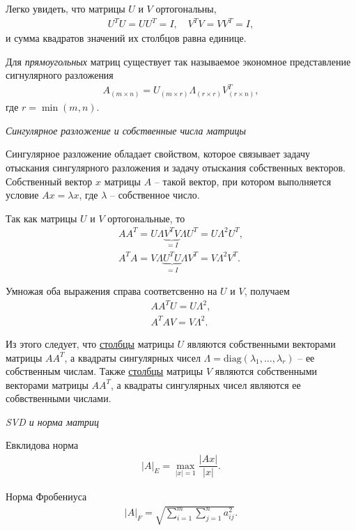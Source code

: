 \documentclass[%
	11pt,
	a4paper,
	utf8,
		]{article}
\begin{document}
Легко увидеть, что матрицы $ U $ и $ V $ ортогональны,
\begin{align*}
	U^T U = UU^T = I, \quad V^T V = V V^T = I,
\end{align*}
и сумма квадратов значений их столбцов равна единице.

Для \emph{прямоугольных} матриц существует так называемое экономное представление сигнулярного разложения
\begin{align*}
	A_{(m \times n)} = U_{(m \times r)} \Lambda_{(r \times r)} V_{(r \times n)}^T,
\end{align*}
где $ r = \min(m, n) $.

\noindent\emph{Сингулярное разложение и собственные числа матрицы}

Сингулярное разложение обладает свойством, которое связывает задачу отыскания сингулярного разложения и задачу отыскания собственных векторов. Собственный вектор $ x $ матрицы $ A $ -- такой вектор, при котором выполняется условие $ A x = \lambda x $, где $ \lambda $ -- собственное число.

Так как матрицы $ U $ и $ V $ ортогональные, то
\begin{align*}
	A A^T = U \Lambda \underbrace{V^T V}_{= I} \Lambda U^T = U \Lambda^2 U^T,\\
	A^T A = V \Lambda \underbrace{U^T U}_{= I} \Lambda V^T = V \Lambda^2 V^T.
\end{align*}

Умножая оба выражения справа соответсвенно на $ U $ и $ V $, получаем
\begin{align*}
	A A^T U = U \Lambda^2,\\
	A^T A V = V\Lambda^2.
\end{align*}

Из этого следует, что \underline{столбцы} матрицы $ U $ являются собственными векторами матрицы $ AA^T $, а квадраты сингулярных чисел $ \Lambda = \text{diag}(\lambda_1, \ldots, \lambda_r) $ -- ее собственным числам. Также \underline{столбцы} матрицы $ V $ являются собственными векторами матрицы $ A A^T $, а квадраты сингулярных чисел являются ее собвственными числами.

\noindent\emph{SVD и норма матриц}

Евклидова норма
\begin{align*}
	|A|_E = \max\limits_{|x| = 1} \dfrac{ |A x| }{ |x| }.
\end{align*}

Норма Фробениуса
\begin{align*}
	|A|_F = \sqrt{\sum_{i=1}^{m}\sum_{j=1}^{n} a_{ij}^2}.
\end{align*}
\end{document}
